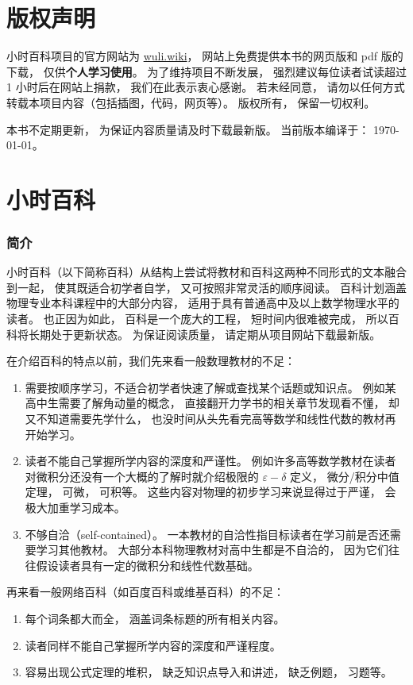 
\chapter*{版权声明}

小时百科项目的官方网站为 \href{https://wuli.wiki}{wuli.wiki}， 网站上免费提供本书的网页版和 pdf 版的下载， 仅供\textbf{个人学习使用}。 为了维持项目不断发展， 强烈建议每位读者试读超过 1 小时后在网站上捐款， 我们在此表示衷心感谢。 若未经同意， 请勿以任何方式转载本项目内容（包括插图，代码，网页等）。 版权所有， 保留一切权利。

本书不定期更新， 为保证内容质量请及时下载最新版。 当前版本编译于： \today。

\chapter*{小时百科}

\subsection{简介}

小时百科（以下简称百科）从结构上尝试将教材和百科这两种不同形式的文本融合到一起， 使其既适合初学者自学， 又可按照非常灵活的顺序阅读。 百科计划涵盖物理专业本科课程中的大部分内容， 适用于具有普通高中及以上数学物理水平的读者。 也正因为如此， 百科是一个庞大的工程， 短时间内很难被完成， 所以百科将长期处于更新状态。 为保证阅读质量， 请定期从项目网站下载最新版。

在介绍百科的特点以前，我们先来看一般数理教材的不足：
\begin{enumerate}
\item 需要按顺序学习，不适合初学者快速了解或查找某个话题或知识点。 例如某高中生需要了解角动量的概念， 直接翻开力学书的相关章节发现看不懂， 却又不知道需要先学什么， 也没时间从头先看完高等数学和线性代数的教材再开始学习。
\item 读者不能自己掌握所学内容的深度和严谨性。 例如许多高等数学教材在读者对微积分还没有一个大概的了解时就介绍极限的 $\varepsilon-\delta$ 定义， 微分/积分中值定理， 可微， 可积等。 这些内容对物理的初步学习来说显得过于严谨， 会极大加重学习成本。
\item 不够自洽（self-contained）。 一本教材的自洽性指目标读者在学习前是否还需要学习其他教材。 大部分本科物理教材对高中生都是不自洽的， 因为它们往往假设读者具有一定的微积分和线性代数基础。
\end{enumerate}

再来看一般网络百科（如百度百科或维基百科）的不足：
\begin{enumerate}
\item 每个词条都大而全， 涵盖词条标题的所有相关内容。
\item 读者同样不能自己掌握所学内容的深度和严谨程度。
\item 容易出现公式定理的堆积， 缺乏知识点导入和讲述， 缺乏例题， 习题等。
\end{enumerate}

